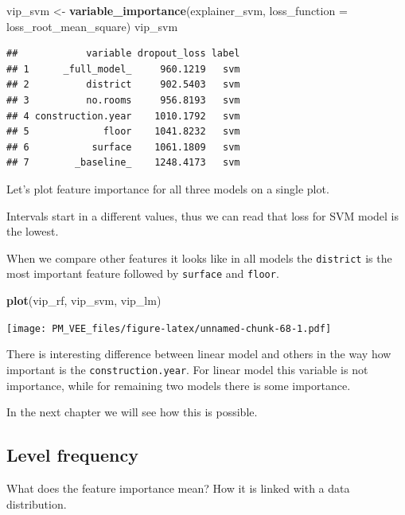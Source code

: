 \documentclass[12pt,]{krantz}
\newenvironment{Shaded}{\begin{snugshade}}{\end{snugshade}}
\newcommand{\DataTypeTok}[1]{\textcolor[rgb]{0.13,0.29,0.53}{#1}}
\newcommand{\KeywordTok}[1]{\textcolor[rgb]{0.13,0.29,0.53}{\textbf{#1}}}
\newcommand{\NormalTok}[1]{#1}
\newcommand{\StringTok}[1]{\textcolor[rgb]{0.31,0.60,0.02}{#1}}
\begin{document}
\begin{Shaded}
\begin{Highlighting}[]
\NormalTok{vip_svm <-}\StringTok{ }\KeywordTok{variable_importance}\NormalTok{(explainer_svm, }
            \DataTypeTok{loss_function =}\NormalTok{ loss_root_mean_square)}
\NormalTok{vip_svm}
\end{Highlighting}
\end{Shaded}

\begin{verbatim}
##            variable dropout_loss label
## 1      _full_model_     960.1219   svm
## 2          district     902.5403   svm
## 3          no.rooms     956.8193   svm
## 4 construction.year    1010.1792   svm
## 5             floor    1041.8232   svm
## 6           surface    1061.1809   svm
## 7        _baseline_    1248.4173   svm
\end{verbatim}

Let's plot feature importance for all three models on a single plot.

Intervals start in a different values, thus we can read that loss for SVM model is the lowest.

When we compare other features it looks like in all models the \texttt{district} is the most important feature followed by \texttt{surface} and \texttt{floor}.

\begin{Shaded}
\begin{Highlighting}[]
\KeywordTok{plot}\NormalTok{(vip_rf, vip_svm, vip_lm)}
\end{Highlighting}
\end{Shaded}

\texttt{[image: PM\_VEE\_files/figure-latex/unnamed-chunk-68-1.pdf]}

There is interesting difference between linear model and others in the way how important is the \texttt{construction.year}. For linear model this variable is not importance, while for remaining two models there is some importance.

In the next chapter we will see how this is possible.

\hypertarget{level-frequency}{%
\subsection{Level frequency}\label{level-frequency}}

What does the feature importance mean? How it is linked with a data distribution.
\end{document}
